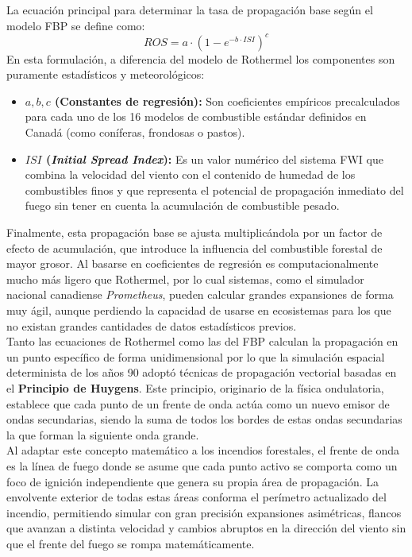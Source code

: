     La ecuación principal para determinar la tasa de propagación base según el modelo FBP se define como:
    $$ROS = a \cdot (1 - e^{-b \cdot ISI})^c$$
    En esta formulación, a diferencia del modelo de Rothermel  los componentes son puramente estadísticos y meteorológicos:
    \begin{itemize}
        \item \textbf{$a, b, c$ (Constantes de regresión):} Son coeficientes empíricos precalculados para cada uno de los 16 modelos de combustible estándar definidos en Canadá (como coníferas, frondosas o pastos).
        \item \textbf{$ISI$ (\textit{Initial Spread Index}):} Es un valor numérico del sistema FWI que combina la velocidad del viento con el contenido de humedad de los combustibles finos y que representa el potencial de propagación inmediato del fuego sin tener en cuenta la acumulación de combustible pesado.
    \end{itemize}

    Finalmente, esta propagación base se ajusta multiplicándola por un factor de efecto de acumulación, que introduce la influencia del combustible forestal de mayor grosor. Al basarse en coeficientes de regresión es computacionalmente mucho más ligero que Rothermel, por lo cual sistemas, como el simulador nacional canadiense \textit{Prometheus}, pueden calcular grandes expansiones de forma muy ágil, aunque perdiendo la capacidad de usarse en ecosistemas para los que no existan grandes cantidades de datos estadísticos previos.\\

    Tanto las ecuaciones de Rothermel como las del FBP calculan la propagación en un punto específico de forma unidimensional por lo que la simulación espacial determinista de los años 90 adoptó técnicas de propagación vectorial basadas en el \textbf{Principio de Huygens}. Este principio, originario de la física ondulatoria, establece que cada punto de un frente de onda actúa como un nuevo emisor de ondas secundarias, siendo la suma de todos los bordes de estas ondas secundarias la que forman la siguiente onda grande\cite{enders2009huygens}. \\

    Al adaptar este concepto matemático a los incendios forestales, el frente de onda es la línea de fuego donde se asume que cada punto activo se comporta como un foco de ignición independiente que genera su propia área de propagación. La envolvente exterior de todas estas áreas conforma el perímetro actualizado del incendio, permitiendo simular con gran precisión expansiones asimétricas, flancos que avanzan a distinta velocidad y cambios abruptos en la dirección del viento sin que el frente del fuego se rompa matemáticamente.\\

